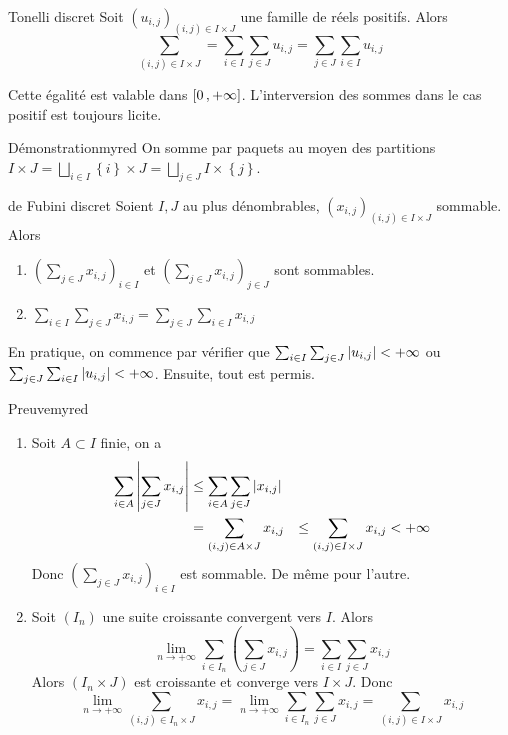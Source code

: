     \begin{theo}{Tonelli discret}{}
        Soit $(u_{i,j})_{(i,j) \in I \times J}$ une famille de réels positifs. Alors 
        \[ \sum_{(i,j) \in I \times J} = \sum_{i \in I} \sum_{j \in J} u_{i,j} = \sum_{j \in J} \sum_{i \in I} u_{i,j} \]   
    \end{theo}

    Cette égalité est valable dans $\left[ 0 \, , +\infty \right]$. L’interversion des sommes dans le cas positif est toujours licite.

    \begin{demo}{Démonstration}{myred}
        On somme par paquets au moyen des partitions $I \times J = \bigsqcup_{i \in I} \left\{i\right\} \times J = \bigsqcup_{j \in J} I \times \left\{j\right\}$.
    \end{demo}

    \begin{theo}{de Fubini discret}{}
        Soient $I,J$ au plus dénombrables, $(x_{i,j})_{(i,j) \in I \times J}$ sommable. Alors 
        \begin{enumerate}
            \item $\left(\sum_{j \in J} x_{i,j}\right)_{i \in I}$ et $\left(\sum_{j \in J} x_{i,j}\right)_{j \in J}$ sont sommables.
            \item $\sum_{i \in I} \sum_{j \in J} x_{i,j} = \sum_{j \in J} \sum_{i \in I} x_{i,j}$
        \end{enumerate}
    \end{theo}

    En pratique, on commence par vérifier que $\sum_{i \in I} \sum_{j \in J} \left\lvert u_{i,j}\right\rvert < +\infty$ ou $\sum_{j \in J} \sum_{i \in I} \left\lvert u_{i,j}\right\rvert < +\infty$. Ensuite, tout est permis.

    \begin{demo}{Preuve}{myred}
        \begin{enumerate}
            \item Soit $A \subset I$ finie, on a 
            \begin{align*}
                \sum_{i \in A} \left\lvert \sum_{j \in J} x_{i,j}\right\rvert 
                &\leq \sum_{i \in A} \sum_{j \in J} \left\lvert x_{i,j}\right\rvert \\
                &= \sum_{(i,j) \in A \times J} x_{i,j}
                &\leq \sum_{(i,j) \in I \times J} x_{i,j} < +\infty
            \end{align*}
            Donc $\left(\sum_{j \in J} x_{i,j}\right)_{i \in I}$ est sommable. De même pour l’autre.
            \item Soit $(I_n)$ une suite croissante convergent vers $I$. Alors 
            \[ \lim_{n \to +\infty} \sum_{i \in I_n} \left(\sum_{j \in J} x_{i,j}\right) = \sum_{i \in I} \sum_{j \in J} x_{i,j} \]   
            Alors $(I_n \times J)$ est croissante et converge vers $I \times J$. Donc \[ \lim_{n \to +\infty} \sum_{(i,j) \in I_n \times J} x_{i,j} = \lim_{n \to +\infty} \sum_{i \in I_n} \sum_{j \in J} x_{i,j} = \sum_{(i,j) \in I \times J} x_{i,j} \]   
        \end{enumerate}
    \end{demo}

